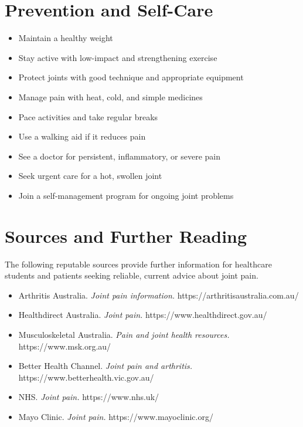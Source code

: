 \section*{Prevention and Self-Care}
\begin{itemize}
    \item Maintain a healthy weight
    \item Stay active with low-impact and strengthening exercise
    \item Protect joints with good technique and appropriate equipment
    \item Manage pain with heat, cold, and simple medicines
    \item Pace activities and take regular breaks
    \item Use a walking aid if it reduces pain
    \item See a doctor for persistent, inflammatory, or severe pain
    \item Seek urgent care for a hot, swollen joint
    \item Join a self-management program for ongoing joint problems
\end{itemize}

\section*{Sources and Further Reading}
The following reputable sources provide further information for healthcare students and patients seeking reliable, current advice about joint pain.
\begin{itemize}
    \item Arthritis Australia. \textit{Joint pain information.} https://arthritisaustralia.com.au/
    \item Healthdirect Australia. \textit{Joint pain.} https://www.healthdirect.gov.au/
    \item Musculoskeletal Australia. \textit{Pain and joint health resources.} https://www.msk.org.au/
    \item Better Health Channel. \textit{Joint pain and arthritis.} https://www.betterhealth.vic.gov.au/
    \item NHS. \textit{Joint pain.} https://www.nhs.uk/
    \item Mayo Clinic. \textit{Joint pain.} https://www.mayoclinic.org/
\end{itemize}

